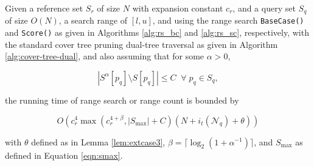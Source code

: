 \begin{thm}
Given a reference set $S_r$ of size $N$ with expansion constant $c_r$, and a
query set $S_q$ of size $O(N)$, a search range of $[l, u]$, and using the range
search \texttt{BaseCase()} and \texttt{Score()} as given in Algorithms
\ref{alg:rs_bc} and \ref{alg:rs_sc}, respectively, with the standard cover tree
pruning dual-tree traversal as given in Algorithm \ref{alg:cover-tree-dual}, and
also assuming that for some $\alpha > 0$,

\begin{equation}
| S^{\alpha}[p_q] \setminus S[p_q] | \le C \; \; \forall \; p_q \in S_q,
\end{equation}


\noindent the running time of range search or range count is bounded by

\begin{equation}
O\left(c_r^{4} \max\left(c_r^{4 + \beta}, |S_{\max}| + C\right) (N +
i_t(\mathscr{N}_q) + \theta)
\right)
\end{equation}

with $\theta$ defined as in Lemma \ref{lem:extcase3},
$\beta = \lceil \log_2 (1 + \alpha^{-1}) \rceil$, and $S_{\max}$ as defined in
Equation \ref{eqn:smax}.
\label{thm:rs}
\end{thm}

